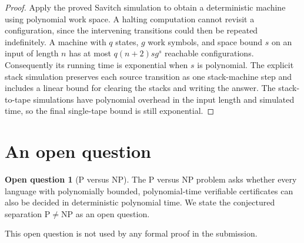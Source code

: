 \documentclass[11pt]{article}
\theoremstyle{definition}
\newtheorem{question}[theorem]{Open question}
\begin{document}
\begin{proof}\leavevmode
Apply the proved Savitch simulation to obtain a deterministic machine using
polynomial work space. A halting computation cannot revisit a configuration,
since the intervening transitions could then be repeated indefinitely.
A machine with $q$ states, $g$ work symbols, and space bound $s$ on an input
of length $n$ has at most $q(n+2)s g^s$ reachable configurations. Consequently
its running time is exponential when $s$ is polynomial. The explicit stack
simulation preserves each source transition as one stack-machine step and
includes a linear bound for clearing the stacks and writing the answer.
The stack-to-tape simulations have polynomial overhead in the input length
and simulated time, so the final single-tape bound is still exponential.
\qedhere
\end{proof}

\section{An open question}
\begin{question}[P versus NP]\leavevmode
The P versus NP problem asks whether every language with polynomially
bounded, polynomial-time verifiable certificates can also be decided in
deterministic polynomial time. We state the conjectured separation
$\mathrm{P} \ne \mathrm{NP}$ as an open question.
\end{question}

This open question is not used by any formal proof in the submission.
\end{document}

